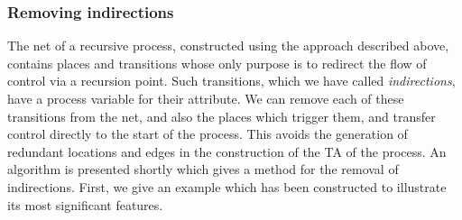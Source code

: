 \subsubsection{Removing indirections}\label{ss:removeind}
The net of a recursive process, constructed using the approach
described above, contains places and transitions whose only purpose is
to redirect the flow of control via a recursion point.  Such
transitions, which we have called \emph{indirections}, have a process
variable for their attribute. We can remove each of these transitions
from the net, and also the places which trigger them, and transfer
control directly to the start of the process. This avoids the
generation of redundant locations and edges in the construction of the
TA of the process. An algorithm is presented shortly which gives a
method for the removal of indirections. First, we give an example which
has been constructed to illustrate its most significant features.

